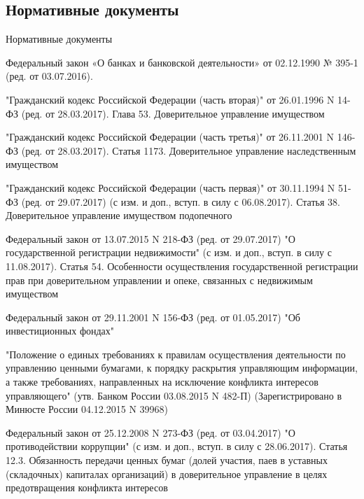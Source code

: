 \documentclass[_Banking_p3.tex]{subfiles}
\begin{document}

\subsection{Нормативные документы}
\begin{frame}[allowframebreaks]{Нормативные документы}
  \begin{thebibliography}{10}
  
  \beamertemplatearticlebibitems
Федеральный закон «О банках и банковской деятельности» от 02.12.1990 № 395-1 (ред. от 03.07.2016).


"Гражданский кодекс Российской Федерации (часть вторая)" от 26.01.1996 N 14-ФЗ (ред. от 28.03.2017). Глава 53. Доверительное управление имуществом

\pagebreak

"Гражданский кодекс Российской Федерации (часть третья)" от 26.11.2001 N 146-ФЗ (ред. от 28.03.2017). Статья 1173. Доверительное управление наследственным имуществом


"Гражданский кодекс Российской Федерации (часть первая)" от 30.11.1994 N 51-ФЗ (ред. от 29.07.2017) (с изм. и доп., вступ. в силу с 06.08.2017). Статья 38. Доверительное управление имуществом подопечного

\pagebreak

Федеральный закон от 13.07.2015 N 218-ФЗ (ред. от 29.07.2017) "О государственной регистрации недвижимости" (с изм. и доп., вступ. в силу с 11.08.2017). Статья 54. Особенности осуществления государственной регистрации прав при доверительном управлении и опеке, связанных с недвижимым имуществом


Федеральный закон от 29.11.2001 N 156-ФЗ (ред. от 01.05.2017) "Об инвестиционных фондах"

\pagebreak

"Положение о единых требованиях к правилам осуществления деятельности по управлению ценными бумагами, к порядку раскрытия управляющим информации, а также требованиях, направленных на исключение конфликта интересов управляющего" (утв. Банком России 03.08.2015 N 482-П) (Зарегистрировано в Минюсте России 04.12.2015 N 39968)

\pagebreak

Федеральный закон от 25.12.2008 N 273-ФЗ (ред. от 03.04.2017) "О противодействии коррупции" (с изм. и доп., вступ. в силу с 28.06.2017). Статья 12.3. Обязанность передачи ценных бумаг (долей участия, паев в уставных (складочных) капиталах организаций) в доверительное управление в целях предотвращения конфликта интересов


\end{thebibliography}
\end{frame}
\end{document}
